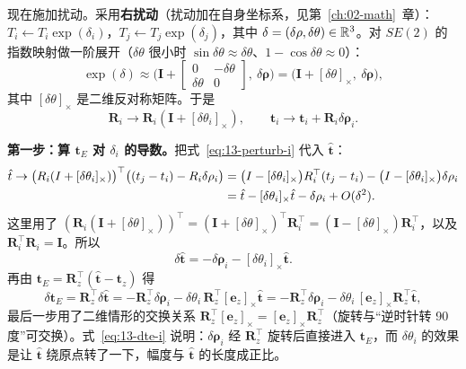 现在施加扰动。采用\textbf{右扰动}（扰动加在自身坐标系，见第~\ref{ch:02-math}~章）：$T_i\leftarrow T_i\exp(\delta_i)$，$T_j\leftarrow T_j\exp(\delta_j)$，其中 $\delta=(\delta\rho,\delta\theta)\in\mathbb{R}^{3}$。对 $SE(2)$ 的指数映射做一阶展开（$\delta\theta$ 很小时 $\sin\delta\theta\approx\delta\theta$、$1-\cos\delta\theta\approx0$）：
\begin{equation}
\exp(\delta)\approx\Big(\bm{I}+\begin{bmatrix}0&-\delta\theta\\\delta\theta&0\end{bmatrix},\ \delta\bm{\rho}\Big)
=\Big(\bm{I}+[\delta\theta]_\times,\ \delta\bm{\rho}\Big),
\label{eq:13-exp2d}
\end{equation}
其中 $[\delta\theta]_\times$ 是二维反对称矩阵。于是
\begin{equation}
\bm{R}_i\to\bm{R}_i(\bm{I}+[\delta\theta_i]_\times),\qquad
\bm{t}_i\to\bm{t}_i+\bm{R}_i\delta\bm{\rho}_i .
\label{eq:13-perturb-i}
\end{equation}

\textbf{第一步：算 $\bm{t}_E$ 对 $\delta_i$ 的导数。}把式~\eqref{eq:13-perturb-i} 代入 $\hat{\bm{t}}$：
\begin{align}
\hat{t}\to\big(R_i(I+[\delta\theta_i]_\times)\big)^{\top}
\big((t_j-t_i)-R_i\delta\rho_i\big)
&=\big(I-[\delta\theta_i]_\times\big)R_i^{\top}(t_j-t_i)
 -\big(I-[\delta\theta_i]_\times\big)\delta\rho_i\notag\\
&=\hat{t}-[\delta\theta_i]_\times\hat{t}-\delta\rho_i+O(\delta^{2}).
\end{align}
这里用了 $(\bm{R}_i(\bm{I}+[\delta\theta]_\times))^{\top}=(\bm{I}+[\delta\theta]_\times)^{\top}\bm{R}_i^{\top}=(\bm{I}-[\delta\theta]_\times)\bm{R}_i^{\top}$，以及 $\bm{R}_i^{\top}\bm{R}_i=\bm{I}$。所以
\begin{equation}
\delta\hat{\bm{t}}=-\delta\bm{\rho}_i-[\delta\theta_i]_\times\hat{\bm{t}} .
\end{equation}
再由 $\bm{t}_E=\bm{R}_z^{\top}(\hat{\bm{t}}-\bm{t}_z)$ 得
\begin{equation}
\delta\bm{t}_E=\bm{R}_z^{\top}\delta\hat{\bm{t}}
=-\bm{R}_z^{\top}\delta\bm{\rho}_i-\delta\theta_i\,\bm{R}_z^{\top}[\bm{e}_z]_\times\hat{\bm{t}}
=-\bm{R}_z^{\top}\delta\bm{\rho}_i-\delta\theta_i\,[\bm{e}_z]_\times\bm{R}_z^{\top}\hat{\bm{t}},
\label{eq:13-dte-i}
\end{equation}
最后一步用了二维情形的交换关系 $\bm{R}_z^{\top}[\bm{e}_z]_\times=[\bm{e}_z]_\times\bm{R}_z^{\top}$（旋转与``逆时针转 90 度''可交换）。式~\eqref{eq:13-dte-i} 说明：$\delta\bm{\rho}_i$ 经 $\bm{R}_z^{\top}$ 旋转后直接进入 $\bm{t}_E$，而 $\delta\theta_i$ 的效果是让 $\hat{\bm{t}}$ 绕原点转了一下，幅度与 $\hat{\bm{t}}$ 的长度成正比。


